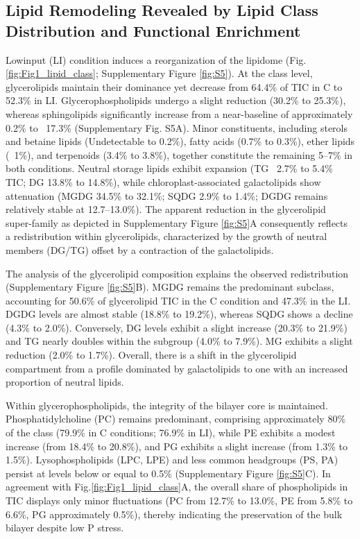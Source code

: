 \documentclass[10pt,letterpaper]{article}
\begin{document}
\begin{itemize}
\subsection*{Lipid Remodeling Revealed by Lipid Class Distribution and Functional Enrichment}
Lowinput (LI) condition induces a reorganization of the lipidome (Fig.\ref{fig:Fig1_lipid_class}; Supplementary Figure \ref{fig:S5}). At the class level, glycerolipids maintain their dominance yet decrease from 64.4\% of TIC in C to 52.3\% in LI. Glycerophospholipids undergo a slight reduction (30.2\% to 25.3\%), whereas sphingolipids significantly increase from a near-baseline of approximately 0.2\% to ~17.3\% (Supplementary Fig. S5A). Minor constituents, including sterols and betaine lipids (Undetectable to 0.2\%), fatty acids (0.7\% to 0.3\%), ether lipids (~1\%), and terpenoids (3.4\% to 3.8\%), together constitute the remaining 5–7\% in both conditions. Neutral storage lipids exhibit expansion (TG ~2.7\% to 5.4\% TIC; DG 13.8\% to 14.8\%), while chloroplast-associated galactolipids show attenuation (MGDG 34.5\% to 32.1\%; SQDG 2.9\% to 1.4\%; DGDG remains relatively stable at 12.7–13.0\%). The apparent reduction in the glycerolipid super-family as depicted in Supplementary Figure \ref{fig:S5}A consequently reflects a redistribution within glycerolipids, characterized by the growth of neutral members (DG/TG) offset by a contraction of the galactolipids.

The analysis of the glycerolipid composition explains the observed redistribution (Supplementary Figure \ref{fig:S5}B). MGDG remains the predominant subclass, accounting for 50.6\% of glycerolipid TIC in the C condition and 47.3\% in the LI. DGDG levels are almost stable (18.8\% to 19.2\%), whereas SQDG shows a decline (4.3\% to 2.0\%). Conversely, DG levels exhibit  a slight increase (20.3\% to 21.9\%) and TG nearly doubles within the subgroup (4.0\% to 7.9\%). MG exhibits a slight reduction (2.0\% to 1.7\%). Overall, there is a shift in the glycerolipid compartment from a profile dominated by galactolipids to one with an increased proportion of neutral lipids.

Within glycerophospholipids, the integrity of the bilayer core is maintained. Phosphatidylcholine (PC) remains predominant, comprising approximately 80\% of the class (79.9\% in C conditions; 76.9\% in LI), while PE exhibits a modest increase (from 18.4\% to 20.8\%), and PG exhibits a slight increase (from 1.3\% to 1.5\%). Lysophospholipids (LPC, LPE) and less common headgroups (PS, PA) persist at levels below or equal to 0.5\% (Supplementary Figure \ref{fig:S5}C). In agreement with Fig.\ref{fig:Fig1_lipid_class}A, the overall share of phospholipids in TIC displays only minor fluctuations (PC from 12.7\% to 13.0\%, PE from 5.8\% to 6.6\%, PG approximately 0.5\%), thereby indicating the preservation of the bulk bilayer despite low P stress.


\end{itemize}
\end{document}
